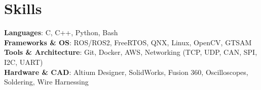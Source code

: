 \documentclass[11pt, letterpaper]{article}
\makeatletter
\newcommand{\resumeItem}[1]{
  \item\small{
    {#1 \vspace{-2pt}}
  }
}
\newcommand{\resumeProjectHeading}[2]{
    \item
    \begin{tabular*}{0.97\textwidth}{l@{\extracolsep{\fill}}r}
      #1 & #2 \\
    \end{tabular*}\vspace{-7pt}
}
\newcommand{\resumeSubHeadingListStart}{\begin{itemize}[leftmargin=0.15in, label={}]}
\newcommand{\resumeSubHeadingListEnd}{\end{itemize}}
\newcommand{\resumeItemListStart}{\begin{itemize}}
\newcommand{\resumeItemListEnd}{\end{itemize}\vspace{-5pt}}
\makeatother
\begin{document}
\section{Skills}
 \begin{itemize}[leftmargin=0.15in, label={}]
    \small{\item{
     \textbf{Languages}{: C, C++, Python, Bash} \\
     \textbf{Frameworks \& OS}{: ROS/ROS2, FreeRTOS, QNX, Linux, OpenCV, GTSAM} \\
     \textbf{Tools \& Architecture}{: Git, Docker, AWS, Networking (TCP, UDP, CAN, SPI, I2C, UART)} \\
     \textbf{Hardware \& CAD}{: Altium Designer, SolidWorks, Fusion 360, Oscilloscopes, Soldering, Wire Harnessing}
    }}
 \end{itemize}


          
\end{document}
